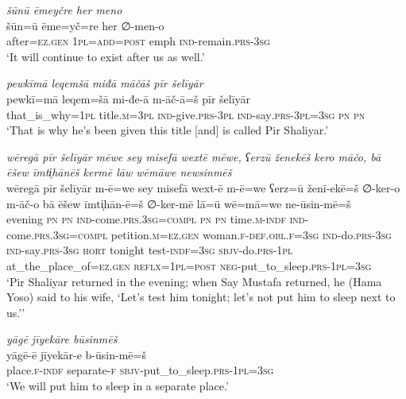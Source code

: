 \ea \label{ZP.129}
\textit{šūnū ēmeyčre her meno} \\ 
\gll šūn=ū ēme=yč=re her ∅-men-o \\ 
 after\textsc{\textsc{=ez.gen}} \textsc{1pl}\textsc{=add}\textsc{=\textsc{post}} emph \textsc{ind-}remain\textsc{.prs}\textsc{-3sg} \\ 
\glt `It will continue to exist after us as well.'
\z 
 
\ea \label{ŽP.4}
\textit{pewkīmā leqemšā miđā māčāš pīr šelīyār} \\ 
\gll pewkī=mā leqem=šā mi-đe-ā m-āč-ā=š pīr šelīyār \\ 
 that\_is\_why\textsc{=1pl} title\textsc{.m}\textsc{=3pl} \textsc{ind-}give\textsc{.prs}\textsc{-3pl} \textsc{ind-}say\textsc{.prs}\textsc{-3pl}\textsc{=3sg} \textsc{pn} \textsc{pn} \\ 
\glt `That is why he’s been given this title [and] is called Pir Shaliyar.'
\z 
 
\ea \label{ŽP.62}
\textit{wēregā pīr šelīyār mēwe sey misefā wextē mēwe, ʕerzū ženekēš kero māčo, bā ēšew īmti̩hānēš kermē lāw wēmāwe newsinmēš} \\ 
\gll wēregā pīr šelīyār m-ē=we sey misefā wext-ē m-ē=we ʕerz=ū ženī-ekē=š ∅-ker-o m-āč-o bā ēšew īmti̩hān-ē=š ∅-ker-mē lā=ū wē=mā=we ne-ūsin-mē=š \\ 
 evening \textsc{pn} \textsc{pn} \textsc{ind-}come\textsc{.prs}\textsc{.3sg}\textsc{=compl} \textsc{pn} \textsc{pn} time\textsc{.m}\textsc{-indf} \textsc{ind-}come\textsc{.prs}\textsc{.3sg}\textsc{=compl} petition\textsc{.m}\textsc{\textsc{=ez.gen}} woman\textsc{.f}\textsc{-def}\textsc{.obl}\textsc{.f}\textsc{=3sg} \textsc{ind-}do\textsc{.prs}\textsc{-3sg} \textsc{ind-}say\textsc{.prs}\textsc{-3sg} \textsc{hort} tonight test\textsc{-indf}\textsc{=3sg} \textsc{sbjv-}do\textsc{.prs}\textsc{-1pl} at\_the\_place\_of\textsc{\textsc{=ez.gen}} \textsc{reflx}\textsc{=1pl}\textsc{=\textsc{post}} \textsc{neg-}put\_to\_sleep\textsc{.prs}\textsc{-1pl}\textsc{=3sg} \\ 
\glt `Pir Shaliyar returned in the evening; when Say Mustafa returned, he (Hama Yoso) said to his wife, ‘Let’s test him tonight; let’s not put him to sleep next to us.’'
\z 
 
\ea \label{ŽP.63}
\textit{yāgē jīyekāre būsinmēš} \\ 
\gll yāgē-ē jīyekār-e b-ūsin-mē=š \\ 
 place\textsc{.f}\textsc{-indf} separate\textsc{-f} \textsc{sbjv-}put\_to\_sleep\textsc{.prs}\textsc{-1pl}\textsc{=3sg} \\ 
\glt `We will put him to sleep in a separate place.'
\z 
 
